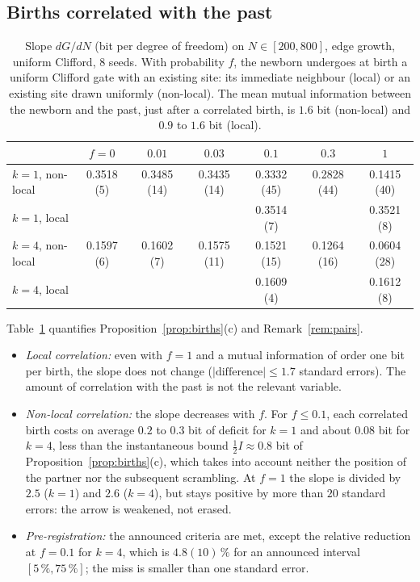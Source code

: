 \subsection{Births correlated with the past}\label{sec:num-correlated}

\begin{table}[h]
\centering\small\setlength{\tabcolsep}{5pt}
\begin{tabular}{lcccccc}
\toprule
 & $f=0$ & $0.01$ & $0.03$ & $0.1$ & $0.3$ & $1$\\
\midrule
$k=1$, non-local & 0.3518 (5) & 0.3485 (14) & 0.3435 (14) & 0.3332 (45) & 0.2828 (44) & 0.1415 (40)\\
$k=1$, local & & & & 0.3514 (7) & & 0.3521 (8)\\
$k=4$, non-local & 0.1597 (6) & 0.1602 (7) & 0.1575 (11) & 0.1521 (15) & 0.1264 (16) & 0.0604 (28)\\
$k=4$, local & & & & 0.1609 (4) & & 0.1612 (8)\\
\bottomrule
\end{tabular}
\caption{Slope $dG/dN$ (bit per degree of freedom) on $N\in[200,800]$, edge growth, uniform Clifford, $8$ seeds. With probability $f$, the newborn undergoes at birth a uniform Clifford gate with an existing site: its immediate neighbour (local) or an existing site drawn uniformly (non-local). The mean mutual information between the newborn and the past, just after a correlated birth, is $1.6$ bit (non-local) and $0.9$ to $1.6$ bit (local).}
\label{tab:correlated}
\end{table}

Table~\ref{tab:correlated} quantifies Proposition~\ref{prop:births}(c) and Remark~\ref{rem:pairs}.
\begin{itemize}[leftmargin=*,itemsep=1pt]
\item \emph{Local correlation:} even with $f=1$ and a mutual information of order one bit per birth, the slope does not change ($|\text{difference}|\le1.7$ standard errors). The amount of correlation with the past is not the relevant variable.
\item \emph{Non-local correlation:} the slope decreases with $f$. For $f\le0.1$, each correlated birth costs on average $0.2$ to $0.3$ bit of deficit for $k=1$ and about $0.08$ bit for $k=4$, less than the instantaneous bound $\frac12I\approx0.8$ bit of Proposition~\ref{prop:births}(c), which takes into account neither the position of the partner nor the subsequent scrambling. At $f=1$ the slope is divided by $2.5$ ($k=1$) and $2.6$ ($k=4$), but stays positive by more than $20$ standard errors: the arrow is weakened, not erased.
\item \emph{Pre-registration:} the announced criteria are met, except the relative reduction at $f=0.1$ for $k=4$, which is $4.8(10)\,\%$ for an announced interval $[5\,\%,75\,\%]$; the miss is smaller than one standard error.
\end{itemize}

